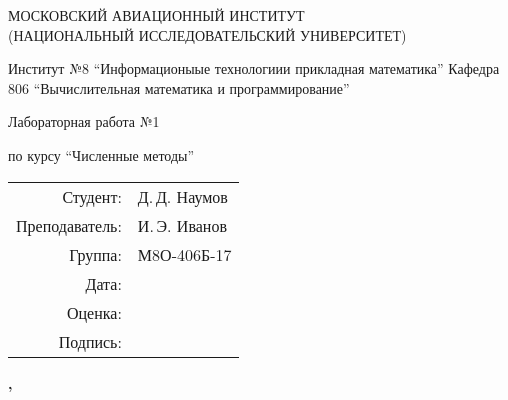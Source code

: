 \begin{titlepage}
\begin{spacing}{1.2}
\begin{center}
{\large 
МОСКОВСКИЙ АВИАЦИОННЫЙ ИНСТИТУТ\\ 
(НАЦИОНАЛЬНЫЙ ИССЛЕДОВАТЕЛЬСКИЙ УНИВЕРСИТЕТ)
}
\vspace{24pt}

{\large
Институт №8 \enquote{Информационыые технологиии прикладная математика}
}
{\large
Кафедра 806 \enquote{Вычислительная математика и программирование}
}
\vspace{96pt}

\bfseries
{\Large
Лабораторная работа №1

по курсу \enquote{Численные методы}
}

\end{center}

\vspace{72pt}

\begin{flushright}
\begin{tabular}{r l}
    \large Студент: & \large Д.\,Д. Наумов \\
    \large Преподаватель: & \large И.\,Э. Иванов \\
    \large Группа: \large & М8О-406Б-17 \\
    \large Дата: & \\
    \large Оценка: & \\
    \large Подпись: & \\
\end{tabular}
\end{flushright}

\vfill

\begin{center}
\bfseries
{}, \the\year
\end{center}
\end{spacing}
\end{titlepage}

\pagebreak

